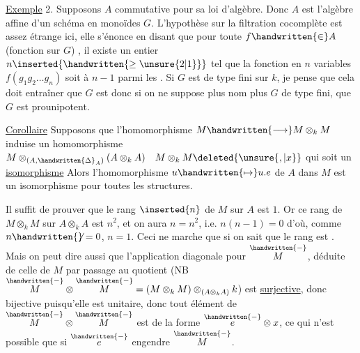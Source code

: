\uline{Exemple} 2. Supposons $A$ commutative pour sa loi d'algèbre. Donc $A$ est l'algèbre affine d'un schéma en monoïdes  $G$. L'hypothèse sur la filtration cocomplète est assez étrange ici, elle s'énonce en disant que pour toute $f\handwritten{\in}A$ (fonction sur $G$) , il existe un entier $n\inserted{\handwritten{\geq\unsure{2|1}}}$ tel que la fonction en $n$ variables $f(g_{1}g_{2}\ldots g_{n})$ soit  à $n-1$ parmi les . Si $G$ est de type fini sur $k$, je pense que  cela doit entraîner que  $G$ est  donc si on ne suppose plus nom plus $G$ de type fini, que $G$ est  prounipotent.


\uline{Corollaire} Supposons que l'homomorphisme $M\handwritten{\longrightarrow}M\otimes_{k}M$ induise un homomorphisme $M\otimes_{(A,\handwritten{\Delta}_{A})}(A\otimes_{k}A)\quad M\otimes_{k}M\deleted{\unsure{,|x}}$  qui soit un \uline{isomorphisme} Alors l'homomorphisme $u\handwritten{\mapsto}u.e$ de $A$ dans $M$ est un isomorphisme pour toutes les structures.

Il suffit de prouver que le rang $\inserted{n}$ de $M$ sur $A$ est $1$. Or ce rang de $M\otimes_{k}M$ sur $A\otimes_{k}A$ est $n^{2}$, et on aura $n=n^{2}$, i.e. $n(n-1)=0$ d'où, comme $n\handwritten{\not}=0$, $n=1$. Ceci ne marche que si on sait que le rang est . Mais on peut dire aussi que l'application diagonale pour $\overset{\handwritten{-}}{M}$, déduite de celle de $M$ par passage au quotient (NB $\overset{\handwritten{-}}{M}\otimes\overset{\handwritten{-}}{M}=(M\otimes_{k}M)\otimes_{(A\otimes_{k}A)}k$) est \uline{surjective}, donc bijective puisqu'elle est unitaire, donc tout élément de $\overset{\handwritten{-}}{M}\otimes\overset{\handwritten{-}}{M}$ est de la forme $\overset{\handwritten{-}}{e}\otimes x$, ce qui n'est possible que si $\overset{\handwritten{-}}{e}$ engendre $\overset{\handwritten{-}}{M}$.

